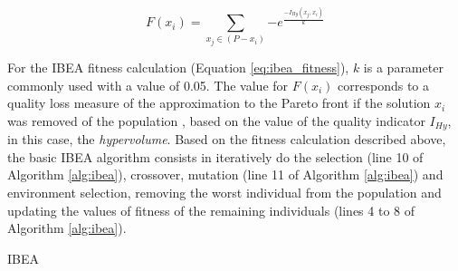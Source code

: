 \begin{equation} \label{eq:ibea_fitness}
	F(x_i) = \sum_{x_j \in (P-x_i)} {-e^\frac{-I_{Hy}(x_j,x_i)}{k}}
\end{equation}


For the IBEA fitness calculation (Equation \ref{eq:ibea_fitness}), $k$ is a parameter commonly used with a value of 0.05. The value for $F(x_i)$ corresponds to a quality loss measure of the approximation to the Pareto front if the solution $x_i$ was removed of the population \cite{figueiredo2013algoritmo}, based on the value of the quality indicator $I_{Hy}$, in this case, the \textit{hypervolume}. Based on the fitness calculation described above, the basic IBEA algorithm consists in iteratively do the selection (line 10 of Algorithm \ref{alg:ibea}), crossover, mutation (line 11 of Algorithm \ref{alg:ibea}) and environment selection, removing the worst individual from the population and updating the values of fitness of the remaining individuals (lines 4 to 8 of Algorithm \ref{alg:ibea}).


\begin{algorithm}[htb!]
	\begin{algorithmic}[1]
	
	
		
		
		\EndWhile
	
	\EndWhile
	
	\end{algorithmic}
	\caption{IBEA}
	\label{alg:ibea}
\end{algorithm}




